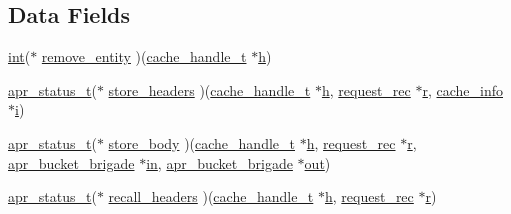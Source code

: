 \subsection*{Data Fields}
\begin{DoxyCompactItemize}
\item 
\hyperlink{pcre_8txt_a42dfa4ff673c82d8efe7144098fbc198}{int}($\ast$ \hyperlink{structcache__provider_ab540cebf28984e6aff448b836a67a7a5}{remove\+\_\+entity} )(\hyperlink{group__MOD__CACHE_ga6b7854a2592838a565bdee8f94343aab}{cache\+\_\+handle\+\_\+t} $\ast$\hyperlink{pcregrep_8txt_a373589baca2cb79ec87f46d6599640b9}{h})
\item 
\hyperlink{group__apr__errno_gaa5105fa83cc322f09382292db8b47593}{apr\+\_\+status\+\_\+t}($\ast$ \hyperlink{structcache__provider_ad08027697ec09826ae214266de0a243f}{store\+\_\+headers} )(\hyperlink{group__MOD__CACHE_ga6b7854a2592838a565bdee8f94343aab}{cache\+\_\+handle\+\_\+t} $\ast$\hyperlink{pcregrep_8txt_a373589baca2cb79ec87f46d6599640b9}{h}, \hyperlink{structrequest__rec}{request\+\_\+rec} $\ast$\hyperlink{pcregrep_8txt_a2e9e9438b26c0bb4425367a7e4f75eb3}{r}, \hyperlink{structcache__info}{cache\+\_\+info} $\ast$\hyperlink{group__MOD__PROXY_ga38403a0592eb8018a3ad61aef0f7ca2c}{i})
\item 
\hyperlink{group__apr__errno_gaa5105fa83cc322f09382292db8b47593}{apr\+\_\+status\+\_\+t}($\ast$ \hyperlink{structcache__provider_a8358c039ec77965944f51b6e9d454e6b}{store\+\_\+body} )(\hyperlink{group__MOD__CACHE_ga6b7854a2592838a565bdee8f94343aab}{cache\+\_\+handle\+\_\+t} $\ast$\hyperlink{pcregrep_8txt_a373589baca2cb79ec87f46d6599640b9}{h}, \hyperlink{structrequest__rec}{request\+\_\+rec} $\ast$\hyperlink{pcregrep_8txt_a2e9e9438b26c0bb4425367a7e4f75eb3}{r}, \hyperlink{structapr__bucket__brigade}{apr\+\_\+bucket\+\_\+brigade} $\ast$\hyperlink{group__apr__thread__proc_ga2e46fea00cc2238744ebca5061c62bcc}{in}, \hyperlink{structapr__bucket__brigade}{apr\+\_\+bucket\+\_\+brigade} $\ast$\hyperlink{apr__sha1_8h_acc4166708bf1c388b137e1861496523e}{out})
\item 
\hyperlink{group__apr__errno_gaa5105fa83cc322f09382292db8b47593}{apr\+\_\+status\+\_\+t}($\ast$ \hyperlink{structcache__provider_a1ebbc419cb9f93c27620e0fe993dbd18}{recall\+\_\+headers} )(\hyperlink{group__MOD__CACHE_ga6b7854a2592838a565bdee8f94343aab}{cache\+\_\+handle\+\_\+t} $\ast$\hyperlink{pcregrep_8txt_a373589baca2cb79ec87f46d6599640b9}{h}, \hyperlink{structrequest__rec}{request\+\_\+rec} $\ast$\hyperlink{pcregrep_8txt_a2e9e9438b26c0bb4425367a7e4f75eb3}{r})
\item 

\end{DoxyCompactItemize}
